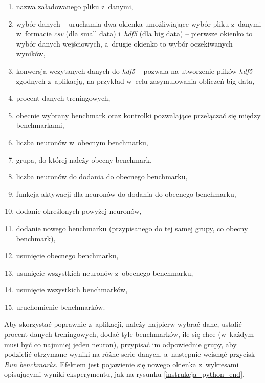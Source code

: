 \documentclass{article}
\begin{document}
\begin{enumerate}
\item nazwa załadowanego pliku z~danymi,
\item wybór danych -- uruchamia dwa okienka umożliwiające wybór pliku z~danymi w~formacie \textit{csv} (dla small data) i~\textit{hdf5} (dla big data) -- pierwsze okienko to wybór danych wejściowych, a~drugie okienko to wybór oczekiwanych wyników,
\item konwersja wczytanych danych do \textit{hdf5} -- pozwala na utworzenie plików \textit{hdf5} zgodnych z~aplikacją, na przykład w~celu zasymulowania obliczeń big data,
\item procent danych treningowych,
\item obecnie wybrany benchmark oraz kontrolki pozwalające przełączać się między benchmarkami,
\item liczba neuronów w~obecnym benchmarku,
\item grupa, do której należy obecny benchmark,
\item liczba neuronów do dodania do obecnego benchmarku,
\item funkcja aktywacji dla neuronów do dodania do obecnego benchmarku,
\item dodanie określonych powyżej neuronów,
\item dodanie nowego benchmarku (przypisanego do tej samej grupy, co obecny benchmark),
\item usunięcie obecnego benchmarku,
\item usunięcie wszystkich neuronów z~obecnego benchmarku,
\item usunięcie wszystkich benchmarków,
\item uruchomienie benchmarków.
\end{enumerate}
Aby skorzystać poprawnie z~aplikacji, należy najpierw wybrać dane, ustalić procent danych treningowych, dodać tyle benchmarków, ile się chce (w~każdym musi być co najmniej jeden neuron), przypisać im odpowiednie grupy, aby podzielić otrzymane wyniki na różne serie danych, a~następnie wcisnąć przycisk \textit{Run benchmarks}. Efektem jest pojawienie się nowego okienka z~wykresami opisującymi wyniki eksperymentu, jak na rysunku \ref{instrukcja_python_end}.
\end{document}
